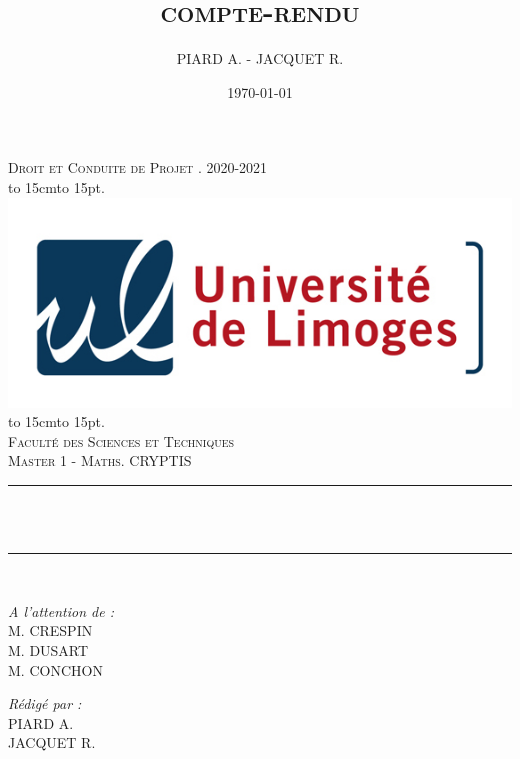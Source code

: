 \documentclass[12pt]{article}
\title{\textsc{compte-rendu}}
\author{PIARD A. - JACQUET R.}
\date{\today}
\makeatletter
\let\thetitle\@title
\def\dotfill#1{\cleaders\hbox to #1{.}\hfill}
\newcommand\dotline[2][.5em]{\leavevmode\hbox to #2{\dotfill{#1}\hfil}}
\makeatother
\begin{document}
\begin{titlepage}
	\centering
    \vspace*{0.5 cm}
    \textsc{\LARGE Droit et Conduite de Projet . 2020-2021}\\[1.0 cm]
    \dotline[15pt]{15cm}\\
	\includegraphics[scale = 2.2]{logo.png}
	\dotline[15pt]{15cm}\\
	\vspace{1.5cm}
	\textsc{\Large Faculté des Sciences et Techniques}\\
	\textsc{\large Master 1 - Maths. CRYPTIS}\\[1.0 cm]
	\rule{\linewidth}{0.2 mm} \\[0.4 cm]
	{ \huge \bfseries \color{blue} \thetitle}\\
	\rule{\linewidth}{0.2 mm} \\[1.5 cm]
	
	\begin{minipage}{0.4\textwidth}
		\begin{flushleft} \large
			\emph{A l'attention de :}\\
			M. CRESPIN\\
			M. DUSART\\
			M. CONCHON\\
		\end{flushleft}
	\end{minipage}
	\begin{minipage}{0.5\textwidth}
    	\begin{flushright} \large
		\emph{Rédigé par :}\\
		PIARD A.\\
		JACQUET R.\\
		\phantom{a}\\
		\end{flushright}
	\end{minipage}\\[2 cm]
\end{titlepage}
\end{document}
